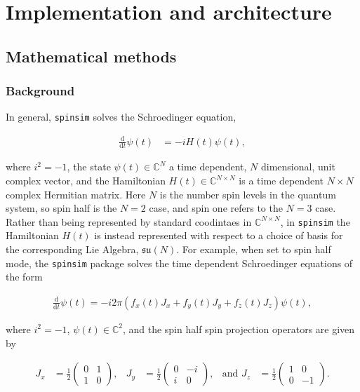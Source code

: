 \documentclass{jors}
\begin{document}
\section*{Implementation and architecture}
	\subsection*{Mathematical methods}
		\subsubsection*{Background}
			In general, \texttt{spinsim} solves the Schroedinger equation,

			\begin{align}
				\frac{\mathrm{d}}{\mathrm{d}t}\psi(t) &= -iH(t)\psi(t),
			\end{align}

			where \(i^2 = -1\), the state \(\psi(t) \in \mathbb{C}^N\) a time dependent, \(N\) dimensional, unit complex vector, and the Hamiltonian \(H(t) \in \mathbb{C}^{N \times N}\) is a time dependent \(N \times N\) complex Hermitian matrix. Here \(N\) is the number spin levels in the quantum system, so spin half is the \(N = 2\) case, and spin one refers to the \(N = 3\) case. Rather than being represented by standard coodintaes in \(\mathbb{C}^{N \times N}\), in \texttt{spinsim} the Hamiltonian \(H(t)\) is instead represented with respect to a choice of basis for the corresponding Lie Algebra, \(\mathfrak{su}(N)\). For example, when set to spin half mode, the \texttt{spinsim} package solves the time dependent Schroedinger equations of the form

			\begin{align}
				\frac{\mathrm{d}}{\mathrm{d}t}\psi(t) = -i 2\pi (f_x(t) J_x + f_y(t) J_y + f_z(t) J_z) \psi(t),
			\end{align}

			where \(i^2 = -1\), \(\psi(t) \in \mathbb{C}^2\), and the spin half spin projection operators are given by

			\begin{align}
				J_x &= \frac12\begin{pmatrix}
					0 & 1 \\
					1 & 0
				\end{pmatrix},
				&J_y &= \frac12\begin{pmatrix}
					0 & -i \\
					i &  0
				\end{pmatrix},
				&\textrm{and }J_z &= \frac12\begin{pmatrix}
					1 &  0 \\
					0 & -1
				\end{pmatrix}.
			\end{align}
\end{document}
